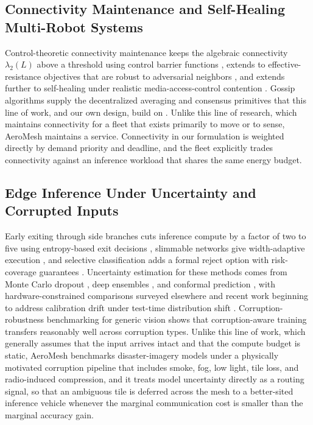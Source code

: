 \documentclass[drones,article,submit,moreauthors]{Definitions/mdpi}
\begin{document}
\subsection{Connectivity Maintenance and Self-Healing Multi-Robot Systems}

Control-theoretic connectivity maintenance keeps the algebraic connectivity $\lambda_2(L)$ above a threshold using control barrier functions \cite{capelli2022network}, extends to effective-resistance objectives that are robust to adversarial neighbors \cite{pan2024distributed}, and extends further to self-healing under realistic media-access-control contention \cite{li2023selfhealing}. Gossip algorithms supply the decentralized averaging and consensus primitives that this line of work, and our own design, build on \cite{dimakis2010gossip}. Unlike this line of research, which maintains connectivity for a fleet that exists primarily to move or to sense, AeroMesh maintains a service. Connectivity in our formulation is weighted directly by demand priority and deadline, and the fleet explicitly trades connectivity against an inference workload that shares the same energy budget.

\subsection{Edge Inference Under Uncertainty and Corrupted Inputs}

Early exiting through side branches cuts inference compute by a factor of two to five using entropy-based exit decisions \cite{teerapittayanon2016branchynet}, slimmable networks give width-adaptive execution \cite{yu2019slimmable}, and selective classification adds a formal reject option with risk-coverage guarantees \cite{geifman2017selective,geifman2019selectivenet}. Uncertainty estimation for these methods comes from Monte Carlo dropout \cite{gal2016dropout}, deep ensembles \cite{lakshminarayanan2017simple}, and conformal prediction \cite{angelopoulos2021gentle}, with hardware-constrained comparisons surveyed elsewhere \cite{gupta2023survey} and recent work beginning to address calibration drift under test-time distribution shift \cite{xi2024tta}. Corruption-robustness benchmarking for generic vision \cite{hendrycks2019benchmarking} shows that corruption-aware training transfers reasonably well across corruption types. Unlike this line of work, which generally assumes that the input arrives intact and that the compute budget is static, AeroMesh benchmarks disaster-imagery models under a physically motivated corruption pipeline that includes smoke, fog, low light, tile loss, and radio-induced compression, and it treats model uncertainty directly as a routing signal, so that an ambiguous tile is deferred across the mesh to a better-sited inference vehicle whenever the marginal communication cost is smaller than the marginal accuracy gain.
\end{document}
